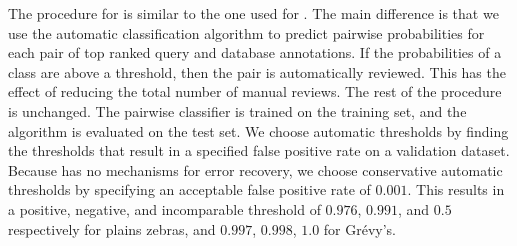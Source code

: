 
    The procedure for  is similar to the one used for .
    The main difference is that we use the automatic classification algorithm to predict pairwise probabilities
      for each pair of top ranked query and database annotations.
    If the probabilities of a class are above a threshold, then the pair is automatically reviewed.
    This has the effect of reducing the total number of manual reviews.
    The rest of the procedure is unchanged.
    The pairwise classifier is trained on the training set, and the algorithm is evaluated on the test set.
    We choose automatic thresholds by finding the thresholds that result in a specified false positive rate on a
      validation dataset.
    Because  has no mechanisms for error recovery, we choose conservative automatic thresholds by
      specifying an acceptable false positive rate of $0.001$.
    This results in a positive, negative, and incomparable threshold of $0.976$, $0.991$, and $0.5$ respectively
      for plains zebras, and $0.997$, $0.998$, $1.0$ for Grévy's.


